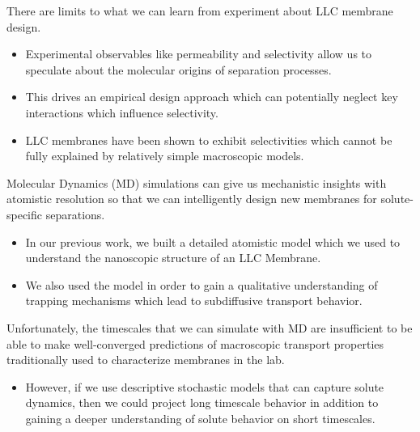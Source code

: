 \documentclass{article}
\begin{document}
  There are limits to what we can learn from experiment about LLC membrane design.
  \begin{itemize}
    \item Experimental observables like permeability and selectivity allow us to speculate
    about the molecular origins of separation processes.
    \item This drives an empirical design approach which can potentially neglect key
    interactions which influence selectivity.
    \item LLC membranes have been shown to exhibit selectivities which cannot be fully 
    explained by relatively simple macroscopic models. 
  \end{itemize}
  
  Molecular Dynamics (MD) simulations can give us mechanistic insights with atomistic 
  resolution so that we can intelligently design new membranes for solute-specific 
  separations.
  \begin{itemize}
    \item In our previous work, we built a detailed atomistic model which we used
    to understand the nanoscopic structure of an LLC Membrane.~\cite{coscia_understanding_2019}
    \item We also used the model in order to gain a qualitative understanding of 
    trapping mechanisms which lead to subdiffusive transport behavior.~\cite{coscia_chemically_2019}
  \end{itemize}

  Unfortunately, the timescales that we can simulate with MD are insufficient to be
  able to make well-converged predictions of macroscopic transport properties 
  traditionally used to characterize membranes in the lab.
  \begin{itemize}
    \item However, if we use descriptive stochastic models that can capture solute
    dynamics, then we could project long timescale behavior in addition to gaining
    a deeper understanding of solute behavior on short timescales.
  \end{itemize}
  
\end{document}
